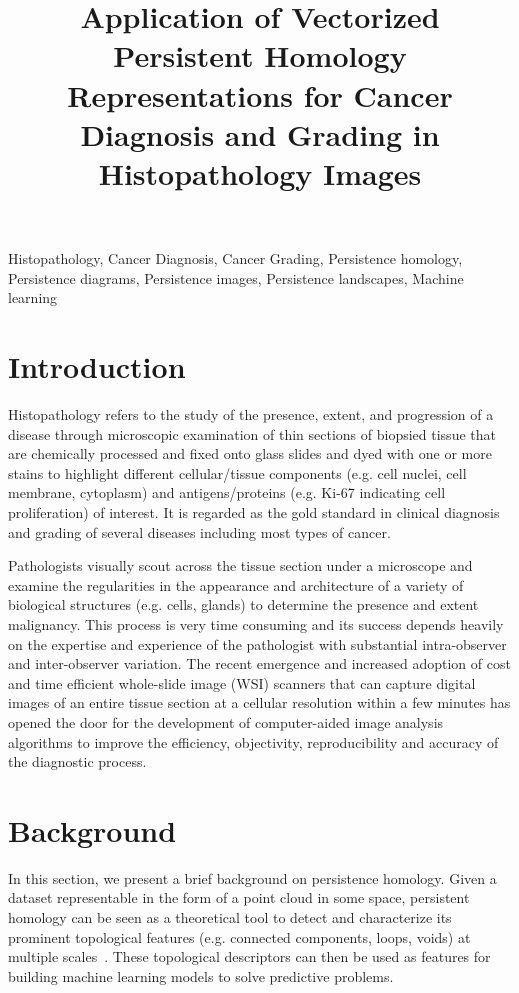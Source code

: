 \documentclass{article}
\title{Application of Vectorized Persistent Homology Representations for 
Cancer Diagnosis and Grading in Histopathology Images}
\begin{document}
%
\maketitle
%
\begin{abstract}

\end{abstract}
%
\begin{keywords}
Histopathology, Cancer Diagnosis, Cancer Grading, Persistence homology, Persistence diagrams, Persistence images, Persistence landscapes, Machine learning
\end{keywords}
%
\section{Introduction}
\label{sec:intro}
Histopathology refers to the study of the presence, extent, and progression of a disease through microscopic examination of thin sections of biopsied tissue that are chemically processed and fixed onto glass slides and dyed with one or more stains to highlight different cellular/tissue components (e.g. cell nuclei, cell membrane, cytoplasm) and antigens/proteins (e.g. Ki-67 indicating cell proliferation) of interest. It is regarded as the gold standard in clinical diagnosis and grading of several diseases including most types of cancer. 

Pathologists visually scout across the tissue section under a microscope and examine the regularities in the appearance and architecture of a variety of biological structures (e.g. cells, glands) to determine the presence and extent malignancy. This process is very time consuming and its success depends heavily on the expertise and experience of the pathologist with substantial intra-observer and inter-observer variation. The recent emergence and increased adoption of cost and time efficient whole-slide image (WSI) scanners that can capture digital images of an entire tissue section at a cellular resolution within a few minutes has opened the door for the development of computer-aided image analysis algorithms to improve the efficiency, objectivity, reproducibility and accuracy of the diagnostic process.

\section{Background}
\label{sec:background}
In this section, we present a brief background on persistence homology. Given a dataset representable in the form of a point cloud in some space, persistent homology can be seen as a theoretical tool to detect and characterize its prominent topological features (e.g. connected components, loops, voids) at multiple scales~\cite{Zhu2013}. These topological descriptors can then be used as features for building machine learning models to solve predictive problems. 
\end{document}
